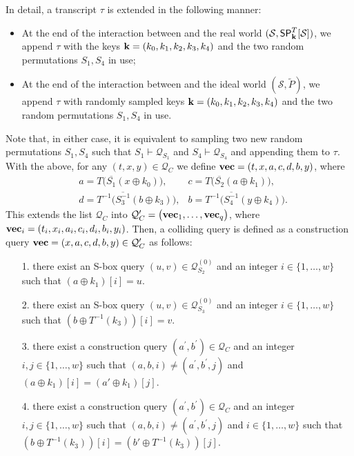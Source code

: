 In detail, a transcript $\tau$ is extended in the following manner:
\begin{itemize}
	\item At the end of the interaction between \dis and the real world $(\mathcal{S},\mathsf{SP}_{\mathbf{k}}^T[\mathcal{S}])$, we append $\tau$ with the keys $\mathbf{k}=(k_0,k_1,k_2,k_3,k_4)$ and the two random permutations $S_1,S_4$ in use;
	\item At the end of the interaction between \dis and the ideal world $(\mathcal{S},\widetilde{P})$, we append $\tau$ with randomly sampled keys $\mathbf{k}=(k_0,k_1,k_2,k_3,k_4)$ and the two random permutations $S_1,S_4$ in use.
\end{itemize}
Note that, in either case, it is equivalent to sampling two new random permutations $S_1,S_4$ such that $S_1\vdash\mathcal{Q}_{S_{1}}$ and $S_4\vdash\mathcal{Q}_{S_4}$ and appending them to $\tau$. With the above, for any $(t,x,y)\in\mathcal{Q}_C$ we define $\mathbf{vec}=(t,x,a,c,d,b,y)$, where
%
\begin{align*}
&a=T\big(\overline{S_1}\left(x \oplus k_{0}\right)\big),  
&c=T\big(\overline{S_2}\left(a \oplus k_1\right)\big),              \\
&d=T^{-1}\big(\overline{S_3^{-1}}\left(b \oplus k_3\right)\big), 
&b=T^{-1}\big(\overline{S_{4}^{-1}}\left(y \oplus k_{4}\right)\big).
\end{align*}
%
This extends the list $\mathcal{Q}_C$ into
$\mathcal{Q}_C'=\big(\mathbf{vec}_1,\ldots,\mathbf{vec}_q\big)$, where $\mathbf{vec}_i=(t_i,x_i,a_i,c_i,d_i,b_i,y_i)$. Then, a colliding query is defined as a construction query $\mathbf{vec}=(x,a,c,d,b,y)\in\mathcal{Q}_C'$ as follows:
%
\begin{itemize}
	\item[1.]
	there exist an S-box query $(u,v)\in\mathcal{Q}_{S_2}^{(0)}$ and an integer $i \in\{1, \ldots, w\}$ such that $\left(a \oplus k_1\right)[i]=u$.
	\item[2.]
	there exist an S-box query $(u,v)\in\mathcal{Q}_{S_3}^{(0)}$ and an integer $i \in\{1, \ldots, w\}$ such that $\left(b \oplus T^{-1}(k_3)\right)[i]=v$.
	\item[3.] there exist a construction query $\left(a^{\prime}, b^{\prime}\right) \in \mathcal{Q}_{C}$ and an integer $i,j \in\{1, \ldots, w\}$ such that $(a, b, i) \neq\left(a^{\prime}, b^{\prime}, j\right)$ and $\left(a \oplus k_1\right)[i] = \left(a' \oplus k_1\right)[j]$.
	\item[4.] there exist a construction query $\left(a^{\prime}, b^{\prime}\right) \in \mathcal{Q}_{C}$ and an integer $i,j \in\{1, \ldots, w\}$ such that $(a, b, i) \neq\left(a^{\prime}, b^{\prime}, j\right)$ and $i \in\{1, \ldots, w\}$ such that $\left(b \oplus T^{-1}(k_3)\right)[i] = \left(b' \oplus T^{-1}(k_3)\right)[j]$.
\end{itemize}
